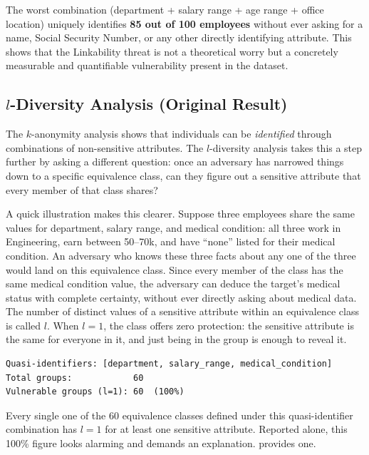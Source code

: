\documentclass[12pt, a4paper]{article}
\begin{document}
The worst combination (department + salary range + age range + office location) uniquely identifies \textbf{85 out of 100 employees} without ever asking for a name, Social Security Number, or any other directly identifying attribute. This shows that the Linkability threat is not a theoretical worry but a concretely measurable and quantifiable vulnerability present in the dataset.

\subsection{$l$-Diversity Analysis (Original Result)}

The $k$-anonymity analysis shows that individuals can be \emph{identified} through combinations of non-sensitive attributes. The $l$-diversity analysis takes this a step further by asking a different question: once an adversary has narrowed things down to a specific equivalence class, can they figure out a sensitive attribute that every member of that class shares?

A quick illustration makes this clearer. Suppose three employees share the same values for department, salary range, and medical condition: all three work in Engineering, earn between 50--70k, and have ``none'' listed for their medical condition. An adversary who knows these three facts about any one of the three would land on this equivalence class. Since every member of the class has the same medical condition value, the adversary can deduce the target's medical status with complete certainty, without ever directly asking about medical data. The number of distinct values of a sensitive attribute within an equivalence class is called $l$. When $l = 1$, the class offers zero protection: the sensitive attribute is the same for everyone in it, and just being in the group is enough to reveal it.

\begin{resultbox}
\begin{lstlisting}[style=termstyle]
Quasi-identifiers: [department, salary_range, medical_condition]
Total groups:            60
Vulnerable groups (l=1): 60  (100%)
\end{lstlisting}
Every single one of the 60 equivalence classes defined under this quasi-identifier combination has $l = 1$ for at least one sensitive attribute. Reported alone, this 100\% figure looks alarming and demands an explanation.  provides one.
\end{resultbox}
\end{document}
